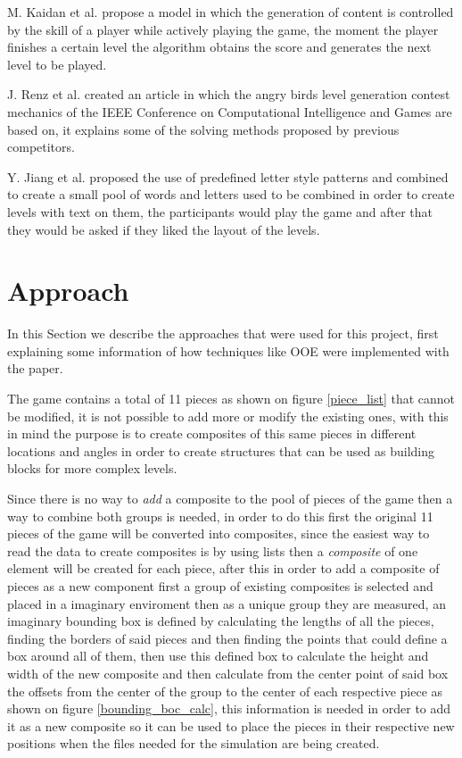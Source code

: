 \documentclass[conference]{IEEEtran}
\begin{document}
M. Kaidan et al. \cite{Kaidan2015} propose a model in which the generation of
content is controlled by the skill of a player while actively playing the game,
the moment the player finishes a certain level the algorithm obtains the score
and generates the next level to be played.

J. Renz et al. \cite{Renz} created an article in which the angry birds level
generation contest mechanics of the IEEE Conference on Computational
Intelligence and Games are based on, it explains some of the solving methods
proposed by previous competitors.

Y. Jiang et al. \cite{Jiang2017} proposed the use of predefined letter style
patterns and combined to create a small pool of words and letters used to be combined in
order to create levels with text on them, the participants would play the game
and after that they would be asked if they liked the layout of the levels.

\section{Approach}

In this Section we describe the approaches that were used for this project, first 
explaining some information of how techniques like OOE were implemented with the paper.

The game contains a total of 11 pieces as shown on figure \ref{piece_list} that
cannot be modified, it is not possible to add more or modify the existing ones,
with this in mind the purpose is to create composites of this same pieces in
different locations and angles in order to create structures that can be used as
building blocks for more complex levels. 

Since there is no way to \textit{add} a composite to the pool of pieces of the 
game then a way to combine both groups is needed, in order to do this first the 
original 11 pieces of the game will be converted into composites, since the easiest
way to read the data to create composites is by using lists then a \textit{composite} 
of one element will be created for each piece, after this in order to add a 
composite of pieces as a new component first a group of existing composites is 
selected and placed in a imaginary enviroment then as a unique group they are 
measured, an imaginary bounding box is defined by calculating the lengths of all
the pieces, finding the borders of said pieces and then finding the points that could
define a box around all of them, then use this defined box to calculate the 
height and width of the new composite and then calculate from 
the center point of said box the offsets from the center of the
group to the center of each respective piece as shown on figure
\ref{bounding_boc_calc}, this information is needed in order to add it as a new
composite so it can be used to place the pieces in their respective new positions
when the files needed for the simulation are being created.
\end{document}
